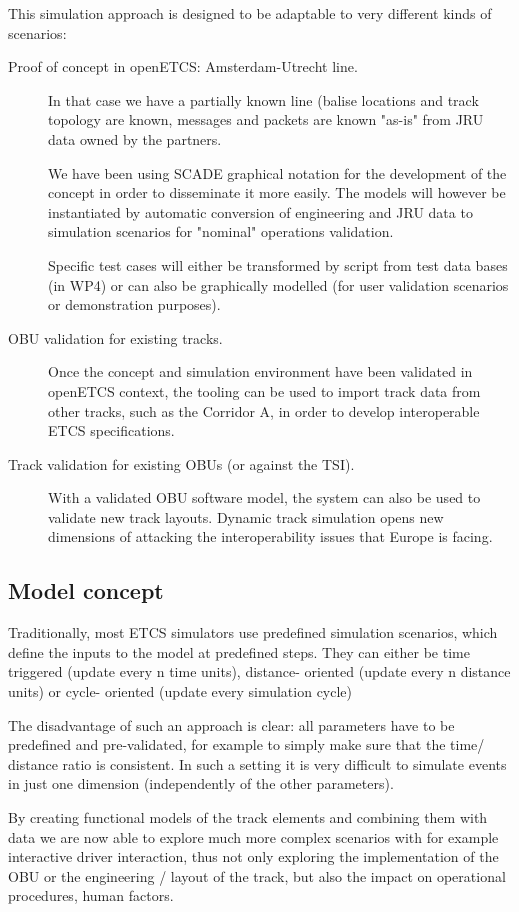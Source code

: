 This simulation approach is designed to be adaptable to very different kinds of scenarios:
\begin{description}
\item[Proof of concept in openETCS: Amsterdam-Utrecht line.]
In that case we have a partially known line (balise locations and track topology are known, messages and packets are known "as-is" from JRU data owned by the partners.

We have been using SCADE graphical notation for the development of the concept in order to disseminate it more easily.
The models will however be instantiated by automatic conversion of engineering and JRU data to simulation scenarios for "nominal" operations validation.

Specific test cases will either be transformed by script from test data bases (in WP4) or can also be graphically modelled (for user validation scenarios or demonstration purposes).
\item[OBU validation for existing tracks.]
Once the concept and simulation environment have been validated in openETCS context, the tooling can be used to import track data from other tracks, such as the Corridor A, in order to develop interoperable ETCS specifications.
\item[Track validation for existing OBUs (or against the TSI).]
With a validated OBU software model, the system can also be used to validate new track layouts. Dynamic track simulation opens new dimensions of attacking the interoperability issues that Europe is facing.
\end{description}
\subsection{Model concept}

Traditionally, most ETCS simulators use predefined simulation scenarios, which define the inputs to the model at predefined steps.
They can either be time triggered (update every n time units), distance- oriented (update every n distance units) or cycle- oriented (update every simulation cycle)

The disadvantage of such an approach is clear: all parameters have to be predefined and pre-validated, for example to simply make sure that the time/ distance ratio is consistent.
In such a setting it is very difficult to simulate events in just one dimension (independently of the other parameters).

By creating functional models of the track elements and combining them with data we are now able to explore much more complex scenarios with for example interactive driver interaction, thus not only exploring the implementation of the OBU or the engineering / layout of the track, but also the impact on operational procedures, human factors.

